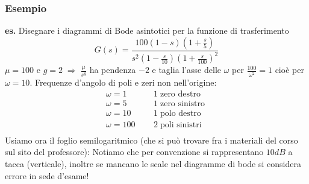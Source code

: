 \subsubsection{Esempio}
\textbf{es.} Disegnare i diagrammi di Bode asintotici per la funzione di trasferimento 
\[
    G(s) = \frac{100(1-s)(1+ \frac{s}{5})}{s^2(1-\frac{s}{10})(1+ \frac{s}{100})^2}
\]
$\mu = 100$ e $g=2 \; \Rightarrow  \; \frac{\mu}{s^g}$ ha pendenza $-2$ e taglia l'asse delle $\omega$ per $\frac{100}{\omega^2} =1$ cioè per $\omega =10$.\newline
\newline
Frequenze d'angolo di poli e zeri non nell'origine:
\[
    \begin{matrix}
        \omega = 1 \;\;\;\;\; & 1 \;\text{zero destro}\; \\
        \omega = 5 \;\;\;\;\; & 1 \;\text{zero sinistro}\; \\
        \omega = 10 \;\;\;\;\; & 1 \;\text{polo destro}\; \\
        \omega = 100 \;\;\;\;\; & 2 \;\text{poli sinistri }\; \\
    \end{matrix}
\]
Usiamo ora il foglio semilogaritmico (che si può trovare fra i materiali del corso sul sito del professore):\newline
{}\newline
\newline
Notiamo che per convenzione si rappresentano $10dB$ a tacca (verticale), inoltre se mancano le scale nel diagramme di bode si considera errore in sede d'esame!